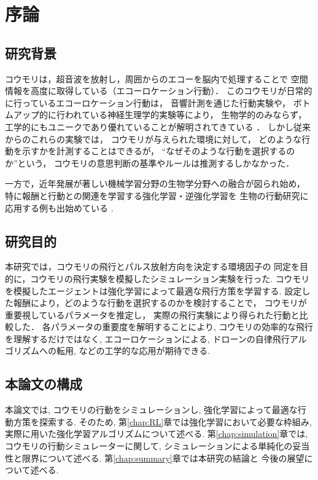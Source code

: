 \documentclass[../main]{subfiles}
\begin{document}
\newpage
\chapter{序論}

\section{研究背景}
コウモリは，超音波を放射し，周囲からのエコーを脳内で処理することで
空間情報を高度に取得している（エコーロケーション行動）．
このコウモリが日常的に行っているエコーロケーション行動は，
音響計測を通じた行動実験や，
ボトムアップ的に行われている神経生理学的実験等により，
生物学的のみならず，
工学的にもユニークであり優れていることが解明されてきている
\cite{ref:bat_enhance}\cite{ref:echolocating_bats}．
しかし従来からのこれらの実験では，
コウモリが与えられた環境に対して，
どのような行動を示すかを計測することはできるが，
“なぜそのような行動を選択するのか”という，
コウモリの意思判断の基準やルールは推測するしかなかった．

一方で，近年発展が著しい機械学習分野の生物学分野への融合が図られ始め，
特に報酬と行動との関連を学習する強化学習・逆強化学習を
生物の行動研究に応用する例も出始めている
\cite{ref:simulating_bout}\cite{ref:can_ai}.


\section{研究目的}
本研究では，コウモリの飛行とパルス放射方向を決定する環境因子の
同定を目的に，コウモリの飛行実験を模擬したシミュレーション実験を行った.
コウモリを模擬したエージェントは強化学習によって最適な飛行方策を学習する.
設定した報酬により，どのような行動を選択するのかを検討することで，
コウモリが重要視しているパラメータを推定し，
実際の飛行実験により得られた行動と比較した．
各パラメータの重要度を解明することにより,
コウモリの効率的な飛行を理解するだけではなく,
エコーロケーションによる,
ドローンの自律飛行アルゴリズムへの転用,
などの工学的な応用が期待できる.

\section{本論文の構成}
本論文では, コウモリの行動をシミュレーションし,
強化学習によって最適な行動方策を探索する.
そのため, 第\ref{chap:RL}章では強化学習において必要な枠組み,
実際に用いた強化学習アルゴリズムについて述べる.
第\ref{chap:simulation}章では, 
コウモリの行動シミュレーターに関して,
シミュレーションによる単純化の妥当性と限界について述べる.
第\ref{chap:summary}章では本研究の結論と
今後の展望について述べる.
\end{document}
